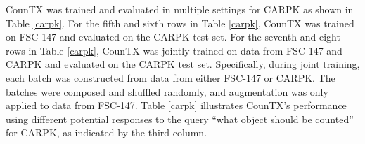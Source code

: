 \documentclass{bmvc2k}
\begin{document}
CounTX was trained and evaluated in multiple settings for CARPK \cite{retina-net} as shown in Table \ref{carpk}. For the fifth and sixth rows in Table \ref{carpk}, CounTX was trained on FSC-147 \cite{m_Ranjan-etal-CVPR21} and evaluated on the CARPK test set. For the seventh and eight rows in Table \ref{carpk}, CounTX was jointly trained on data from FSC-147 and CARPK and evaluated on the CARPK test set. Specifically, during joint training, each batch was constructed from data from either FSC-147 or CARPK. The batches were composed and shuffled randomly, and augmentation was only applied to data from FSC-147. Table \ref{carpk} illustrates CounTX's performance using different potential responses to the query ``what object should be counted'' for CARPK, as indicated by the third column.\\
\end{document}
